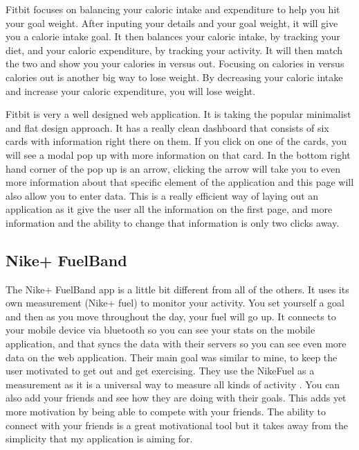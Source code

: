 Fitbit focuses on balancing your caloric intake and expenditure to help you hit your goal weight. After inputing your details and your goal weight, it will give you a calorie intake goal. It then balances your caloric intake, by tracking your diet, and your caloric expenditure, by tracking your activity. It will then match the two and show you your calories in versus out. Focusing on calories in versus calories out is another big way to lose weight. By decreasing your caloric intake and increase your caloric expenditure, you will lose weight.

Fitbit is very a well designed web application. It is taking the popular minimalist and flat design approach. It has a really clean dashboard that consists of six cards with information right there on them. If you click on one of the cards, you will see a modal pop up with more information on that card. In the bottom right hand corner of the pop up is an arrow, clicking the arrow will take you to even more information about that specific element of the application and this page will also allow you to enter data. This is a really efficient way of laying out an application as it give the user all the information on the first page, and more information and the ability to change that information is only two clicks away.

\subsection{Nike+ FuelBand}
The Nike+ FuelBand app is a little bit different from all of the others. It uses its own measurement (Nike+ fuel) to monitor your activity. You set yourself a goal and then as you move throughout the day, your fuel will go up. It connects to your mobile device via bluetooth so you can see your stats on the mobile application, and that syncs the data with their servers so you can see even more data on the web application. Their main goal was similar to mine, to keep the user motivated to get out and get exercising. They use the NikeFuel as a measurement as it is a universal way to measure all kinds of activity \citep{fuelbandpress:2013}. You can also add your friends and see how they are doing with their goals. This adds yet more motivation by being able to compete with your friends. The ability to connect with your friends is a great motivational tool but it takes away from the simplicity that my application is aiming for.

